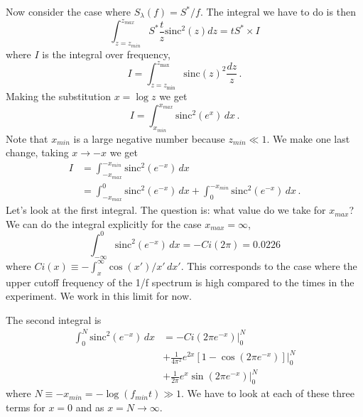 \documentclass{article}
\begin{document}
Now consider the case where $S_{\lambda}(f)=S^{*}/f$.
The integral we have to do is then
\begin{equation}
\int_{z=z_{min}}^{z_{max}}S^{*}\frac{t}{z}\textrm{sinc}^{2}\left(z\right)dz=tS^{*} \times I
\end{equation}
where $I$ is the integral over frequency,
\begin{equation}
I = \int_{z=z_{\textrm{min}}}^{z_{\textrm{max}}} \textrm{sinc}(z)^{2}\frac{dz}{z} \, .
\end{equation}
Making the substitution $x=\log z$ we get
\begin{equation}
I=\int_{x_{min}}^{x_{max}}\textrm{sinc}^{2}(e^{x})\, dx \, .
\end{equation}
Note that $x_{min}$ is a large negative number because $z_{min}\ll1$.
We make one last change, taking $x\rightarrow-x$ we get
\begin{align}
I & = \int_{-x_{max}}^{-x_{min}}\textrm{sinc}^{2}\left(e^{-x}\right)\, dx\\
& = \int_{-x_{max}}^{0}\textrm{sinc}^{2}\left(e^{-x}\right)\, dx+\int_{0}^{-x_{min}}\textrm{sinc}^{2}\left(e^{-x}\right) \, dx \, .
\end{align}
Let's look at the first integral.
The question is: what value do we take for $x_{max}$?
We can do the integral explicitly for the case $x_{max}=\infty$,
\begin{equation}
\int_{-\infty}^{0}\textrm{sinc}^{2}\left(e^{-x}\right)\, dx=-Ci(2\pi)=0.0226
\end{equation}
where $Ci(x)\equiv-\int_{x}^{\infty}\cos(x')/x'\, dx'$.
This corresponds to the case where the upper cutoff frequency of the 1/f spectrum is high compared to the times in the experiment.
We work in this limit for now.

The second integral is\begin{align*}
\int_{0}^{N}\textrm{sinc}^{2}\left(e^{-x}\right)\, dx & =
-Ci(2\pi e^{-x})|_{0}^{N} \\
&+ \frac{1}{4\pi^{2}}e^{2x}\left[1-\cos\left(2\pi e^{-x}\right)\right]|_{0}^{N} \\
&+ \frac{1}{2\pi}e^{x}\sin\left(2\pi e^{-x}\right)|_{0}^{N}
\end{align*}
 where $N\equiv-x_{min}=-\log(f_{min}t)\gg1$. We have to look at
each of these three terms for $x=0$ and as $x=N\rightarrow\infty$. 
\end{document}
